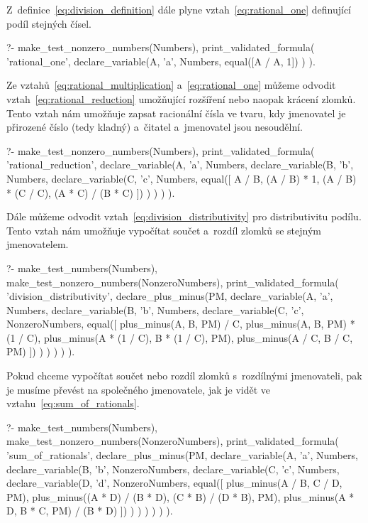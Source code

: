 Z~definice~\eqref{eq:division_definition} dále plyne vztah~\eqref{eq:rational_one} definující podíl stejných čísel.

\begin{prolog}
?-	make_test_nonzero_numbers(Numbers),
	print_validated_formula(
		'rational_one',
		declare_variable(A, 'a', Numbers,
			equal([A / A, 1])
		)
	).
\end{prolog}

Ze vztahů~\eqref{eq:rational_multiplication} a~\eqref{eq:rational_one} můžeme odvodit vztah~\eqref{eq:rational_reduction} umožňující rozšíření nebo naopak krácení zlomků. Tento vztah nám umožňuje zapsat racionální čísla ve tvaru, kdy jmenovatel je přirozené číslo (tedy kladný) a~čitatel a~jmenovatel jsou nesoudělní.

\begin{prolog}
?-	make_test_nonzero_numbers(Numbers),
	print_validated_formula(
		'rational_reduction',
		declare_variable(A, 'a', Numbers,
			declare_variable(B, 'b', Numbers,
				declare_variable(C, 'c', Numbers,
					equal([
						A / B,
						(A / B) * 1,
						(A / B) * (C / C),
						(A * C) / (B * C)
					])
				)
			)
		)
	).
\end{prolog}

Dále můžeme odvodit vztah~\eqref{eq:division_distributivity} pro distributivitu podílu. Tento vztah nám umožňuje vypočítat součet a~rozdíl zlomků se stejným jmenovatelem.

\begin{prolog}
?-	make_test_numbers(Numbers),
	make_test_nonzero_numbers(NonzeroNumbers),
	print_validated_formula(
		'division_distributivity',
		declare_plus_minus(PM,
			declare_variable(A, 'a', Numbers,
				declare_variable(B, 'b', Numbers,
					declare_variable(C, 'c', NonzeroNumbers,
						equal([
							plus_minus(A, B, PM) / C,
							plus_minus(A, B, PM) * (1 / C),
							plus_minus(A * (1 / C), B * (1 / C), PM),
							plus_minus(A / C, B / C, PM)
						])
					)
				)
			)
		)
	).
\end{prolog}

Pokud chceme vypočítat součet nebo rozdíl zlomků s~rozdílnými jmenovateli, pak je musíme převést na společného jmenovatele, jak je vidět ve vztahu~\eqref{eq:sum_of_rationals}.

\begin{prolog}
?-	make_test_numbers(Numbers),
	make_test_nonzero_numbers(NonzeroNumbers),
	print_validated_formula(
		'sum_of_rationals',
		declare_plus_minus(PM,
			declare_variable(A, 'a', Numbers,
				declare_variable(B, 'b', NonzeroNumbers,
					declare_variable(C, 'c', Numbers,
						declare_variable(D, 'd', NonzeroNumbers,
							equal([
								plus_minus(A / B, C / D, PM),
								plus_minus((A * D) / (B * D), (C * B) / (D * B), PM),
								plus_minus(A * D, B * C, PM) / (B * D)
							])
						)
					)
				)
			)
		)
	).
\end{prolog}

